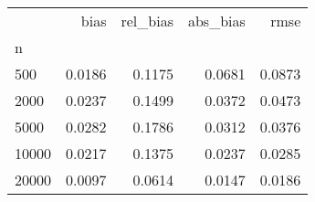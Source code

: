 \begin{tabular}{lrrrr}
\toprule
{} &   bias &  rel\_bias &  abs\_bias &   rmse \\
n     &        &           &           &        \\
\midrule
500   & 0.0186 &    0.1175 &    0.0681 & 0.0873 \\
2000  & 0.0237 &    0.1499 &    0.0372 & 0.0473 \\
5000  & 0.0282 &    0.1786 &    0.0312 & 0.0376 \\
10000 & 0.0217 &    0.1375 &    0.0237 & 0.0285 \\
20000 & 0.0097 &    0.0614 &    0.0147 & 0.0186 \\
\bottomrule
\end{tabular}
